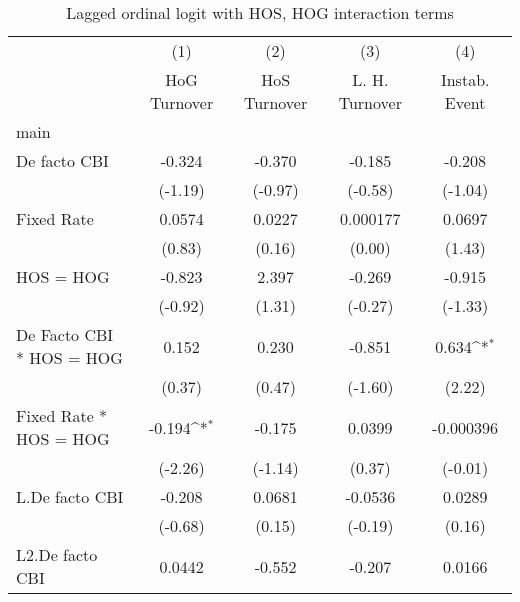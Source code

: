{
\def\sym#1{\ifmmode^{#1}\else\(^{#1}\)\fi}
\begin{longtable}{l*{4}{c}}
\caption{Lagged ordinal logit with HOS, HOG interaction terms \label{hoshogintlagordLogLogDF}}\\
\hline\hline\endfirsthead\hline\endhead\hline\endfoot\endlastfoot
                &\multicolumn{1}{c}{(1)}&\multicolumn{1}{c}{(2)}&\multicolumn{1}{c}{(3)}&\multicolumn{1}{c}{(4)}\\
                &\multicolumn{1}{c}{HoG Turnover}&\multicolumn{1}{c}{HoS Turnover}&\multicolumn{1}{c}{L. H. Turnover}&\multicolumn{1}{c}{Instab. Event}\\
\hline
main            &                  &                  &                  &                  \\
De facto CBI    &   -0.324         &   -0.370         &   -0.185         &   -0.208         \\
                &  (-1.19)         &  (-0.97)         &  (-0.58)         &  (-1.04)         \\
[1em]
Fixed Rate      &   0.0574         &   0.0227         & 0.000177         &   0.0697         \\
                &   (0.83)         &   (0.16)         &   (0.00)         &   (1.43)         \\
[1em]
HOS = HOG       &   -0.823         &    2.397         &   -0.269         &   -0.915         \\
                &  (-0.92)         &   (1.31)         &  (-0.27)         &  (-1.33)         \\
[1em]
De Facto CBI * HOS = HOG&    0.152         &    0.230         &   -0.851         &    0.634\sym{*}  \\
                &   (0.37)         &   (0.47)         &  (-1.60)         &   (2.22)         \\
[1em]
Fixed Rate * HOS = HOG&   -0.194\sym{*}  &   -0.175         &   0.0399         &-0.000396         \\
                &  (-2.26)         &  (-1.14)         &   (0.37)         &  (-0.01)         \\
[1em]
L.De facto CBI  &   -0.208         &   0.0681         &  -0.0536         &   0.0289         \\
                &  (-0.68)         &   (0.15)         &  (-0.19)         &   (0.16)         \\
[1em]
L2.De facto CBI &   0.0442         &   -0.552         &   -0.207         &   0.0166         \\

\end{longtable}}

